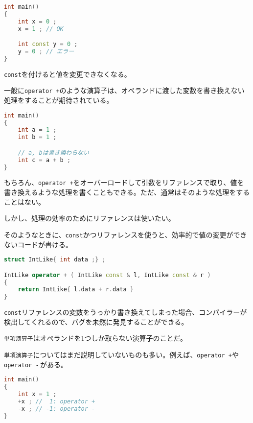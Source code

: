 \begin{lstlisting}[language={C++}]
int main()
{
    int x = 0 ;
    x = 1 ; // OK

    int const y = 0 ;
    y = 0 ; // エラー
}
\end{lstlisting}

\texttt{const}を付けると値を変更できなくなる。

一般に\texttt{operator +}のような演算子は、オペランドに渡した変数を書き換えない処理をすることが期待されている。

\begin{lstlisting}[language={C++}]
int main()
{
    int a = 1 ;
    int b = 1 ;

    // a, bは書き換わらない
    int c = a + b ;
}
\end{lstlisting}

もちろん、\texttt{operator +}をオーバーロードして引数をリファレンスで取り、値を書き換えるような処理を書くこともできる。ただ、通常はそのような処理をすることはない。

しかし、処理の効率のためにリファレンスは使いたい。

そのようなときに、\texttt{const}かつリファレンスを使うと、効率的で値の変更ができないコードが書ける。

\ifTombow\pagebreak\fi
\begin{lstlisting}[language={C++}]
struct IntLike{ int data ;} ;

IntLike operator + ( IntLike const & l, IntLike const & r )
{
    return IntLike{ l.data + r.data }
}
\end{lstlisting}

\texttt{const}リファレンスの変数をうっかり書き換えてしまった場合、コンパイラーが検出してくれるので、バグを未然に発見することができる。


\texttt{単項演算子}はオペランドを1つしか取らない演算子のことだ。

\texttt{単項演算子}についてはまだ説明していないものも多い。例えば、\texttt{operator +}や\texttt{operator -}\,がある。

\begin{lstlisting}[language={C++}]
int main()
{
    int x = 1 ;
    +x ; //  1: operator +
    -x ; // -1: operator -
}
\end{lstlisting}

